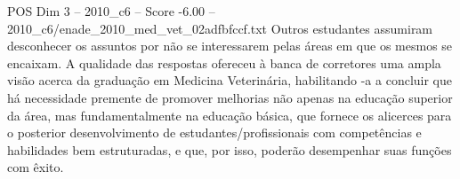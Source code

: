 \begin{textsample}{POS Dim 3 – 2010\_c6 – Score -6.00 – 2010\_c6/enade\_2010\_med\_vet\_02adfbfccf.txt}
Outros estudantes assumiram desconhecer os assuntos por não se interessarem pelas áreas em que os mesmos se encaixam.
A qualidade das respostas ofereceu à banca de corretores uma ampla visão acerca da graduação em Medicina Veterinária, habilitando -a a concluir que há necessidade premente de promover melhorias não apenas na educação superior da área, mas fundamentalmente na educação básica, que fornece os alicerces para o posterior desenvolvimento de estudantes/profissionais com competências e habilidades bem estruturadas, e que, por isso, poderão desempenhar suas funções com êxito.

\end{textsample}
